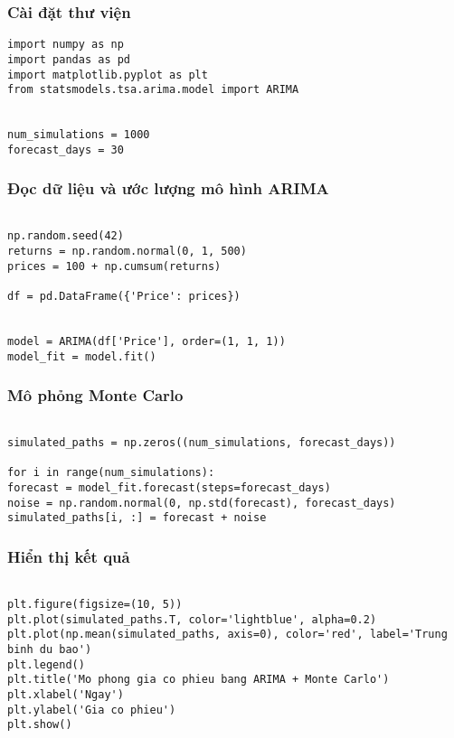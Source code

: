 \subsubsection{Cài đặt thư viện}
\begin{lstlisting}[basicstyle=\ttfamily\large]
import numpy as np
import pandas as pd
import matplotlib.pyplot as plt
from statsmodels.tsa.arima.model import ARIMA


num_simulations = 1000
forecast_days = 30
\end{lstlisting}

\subsubsection{Đọc dữ liệu và ước lượng mô hình ARIMA}
\begin{lstlisting}[basicstyle=\ttfamily\large]

np.random.seed(42)
returns = np.random.normal(0, 1, 500)  
prices = 100 + np.cumsum(returns)  

df = pd.DataFrame({'Price': prices})


model = ARIMA(df['Price'], order=(1, 1, 1))
model_fit = model.fit()
\end{lstlisting}

\subsubsection{Mô phỏng Monte Carlo}
\begin{lstlisting}[basicstyle=\ttfamily\large]

simulated_paths = np.zeros((num_simulations, forecast_days))

for i in range(num_simulations):
forecast = model_fit.forecast(steps=forecast_days)
noise = np.random.normal(0, np.std(forecast), forecast_days)
simulated_paths[i, :] = forecast + noise
\end{lstlisting}

\subsubsection{Hiển thị kết quả}
\begin{lstlisting}[basicstyle=\ttfamily\large]

plt.figure(figsize=(10, 5))
plt.plot(simulated_paths.T, color='lightblue', alpha=0.2)
plt.plot(np.mean(simulated_paths, axis=0), color='red', label='Trung binh du bao')
plt.legend()
plt.title('Mo phong gia co phieu bang ARIMA + Monte Carlo')
plt.xlabel('Ngay')
plt.ylabel('Gia co phieu')
plt.show()
\end{lstlisting}


